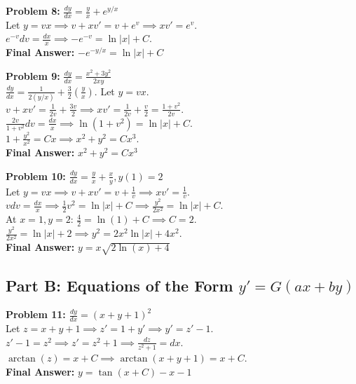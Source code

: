 \documentclass[12pt]{article}
\begin{document}
\vspace{10pt}
\textbf{Problem 8:} $\frac{dy}{dx} = \frac{y}{x} + e^{y/x}$ \\
Let $y=vx \implies v + xv' = v + e^v \implies xv' = e^v$. \\
$e^{-v} dv = \frac{dx}{x} \implies -e^{-v} = \ln|x| + C$. \\
\textbf{Final Answer:} $-e^{-y/x} = \ln|x| + C$

\vspace{10pt}
\textbf{Problem 9:} $\frac{dy}{dx} = \frac{x^2 + 3y^2}{2xy}$ \\
$\frac{dy}{dx} = \frac{1}{2(y/x)} + \frac{3}{2}\left(\frac{y}{x}\right)$. Let $y=vx$. \\
$v + xv' = \frac{1}{2v} + \frac{3v}{2} \implies xv' = \frac{1}{2v} + \frac{v}{2} = \frac{1+v^2}{2v}$. \\
$\frac{2v}{1+v^2} dv = \frac{dx}{x} \implies \ln(1+v^2) = \ln|x| + C$. \\
$1 + \frac{y^2}{x^2} = Cx \implies x^2 + y^2 = Cx^3$. \\
\textbf{Final Answer:} $x^2 + y^2 = Cx^3$

\vspace{10pt}
\textbf{Problem 10:} $\frac{dy}{dx} = \frac{y}{x} + \frac{x}{y}, y(1)=2$ \\
Let $y=vx \implies v + xv' = v + \frac{1}{v} \implies xv' = \frac{1}{v}$. \\
$v dv = \frac{dx}{x} \implies \frac{1}{2}v^2 = \ln|x| + C \implies \frac{y^2}{2x^2} = \ln|x| + C$. \\
At $x=1, y=2$: $\frac{4}{2} = \ln(1) + C \implies C = 2$. \\
$\frac{y^2}{2x^2} = \ln|x| + 2 \implies y^2 = 2x^2 \ln|x| + 4x^2$. \\
\textbf{Final Answer:} $y = x\sqrt{2\ln(x) + 4}$

\subsection*{Part B: Equations of the Form $y' = G(ax+by)$}

\textbf{Problem 11:} $\frac{dy}{dx} = (x+y+1)^2$ \\
Let $z = x+y+1 \implies z' = 1+y' \implies y' = z'-1$. \\
$z' - 1 = z^2 \implies z' = z^2 + 1 \implies \frac{dz}{z^2+1} = dx$. \\
$\arctan(z) = x + C \implies \arctan(x+y+1) = x + C$. \\
\textbf{Final Answer:} $y = \tan(x+C) - x - 1$
\end{document}
